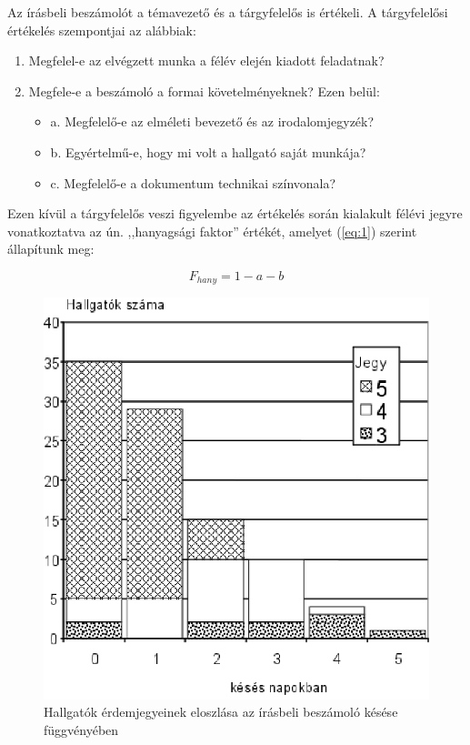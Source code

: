 \documentclass[a4paper,oneside]{article}
\begin{document}
Az írásbeli beszámolót a témavezető és a tárgyfelelős is értékeli. A
tárgyfelelősi értékelés szempontjai az alábbiak:
\begin{enumerate}
\item Megfelel-e az elvégzett munka a félév elején kiadott feladatnak?
\item Megfele-e a beszámoló a formai követelményeknek? Ezen belül:
  \begin{itemize}
  \item a. Megfelelő-e az elméleti bevezető és az irodalomjegyzék?
  \item b. Egyértelmű-e, hogy mi volt a hallgató saját munkája?
  \item c. Megfelelő-e a dokumentum technikai színvonala?
  \end{itemize}

\end{enumerate}
Ezen kívül a tárgyfelelős veszi figyelembe az értékelés során
kialakult félévi jegyre vonatkoztatva az ún. ,,hanyagsági faktor''
értékét, amelyet (\ref{eq:1}) szerint állapítunk meg:

\begin{equation}
    F_{hany} = 1 - a - b
  \label{eq:1}
\end{equation}


\begin{figure}[tbh]
  \centering
  \includegraphics[]{fig1.eps}
  \caption{Hallgatók érdemjegyeinek eloszlása az írásbeli beszámoló késése függvényében}
  \label{fig:fig1}
\end{figure}
\end{document}
